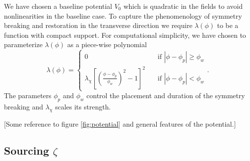 We have chosen a baseline potential $V_0$ which is quadratic in the fields to avoid nonlinearities in the baseline case.
To capture the phenomenology of symmetry breaking and restoration in the transverse direction we require $\lambda(\phi)$ to be a function with compact support.
For computational simplicity, we have chosen to parameterize $\lambda(\phi)$ as a piece-wise polynomial
\begin{equation} \label{eq:lambda}
  \lambda(\phi) =
  \begin{cases}
    0 & \quad \text{if } |\phi-\phi_p|\ge\phi_w \\
    \lambda_\chi\left[\left(\frac{\phi-\phi_p}{\phi_w}\right)^2 - 1 \right]^2 & \quad \text{if  } |\phi-\phi_p|<\phi_w
  \end{cases}.
\end{equation}
The parameters $\phi_p$ and $\phi_w$ control the placement and duration of the symmetry breaking and $\lambda_\chi$
scales its strength.


[Some reference to figure \ref{fig:potential} and general features of the potential.]

\subsection{Sourcing $\zeta$}

